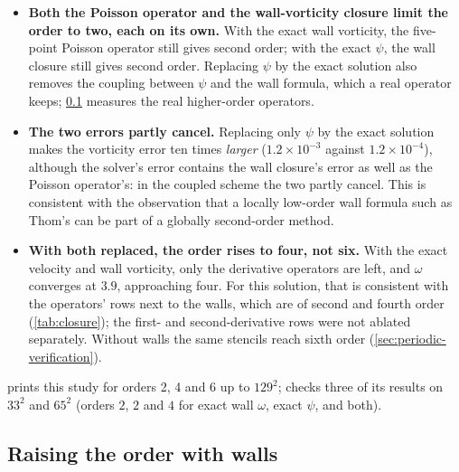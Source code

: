 \documentclass[11pt,a4paper]{article}
\newcommand{\code}[1]{\texttt{\detokenize{#1}}}
\begin{document}
\begin{itemize}[leftmargin=2em]
  \item \textbf{Both the Poisson operator and the wall-vorticity closure limit the order to two, each on its own.}  With the exact wall vorticity, the five-point Poisson operator still gives second order; with the exact $\psi$, the wall closure still gives second order.  Replacing $\psi$ by the exact solution also removes the coupling between $\psi$ and the wall formula, which a real operator keeps; \cref{sec:wall-order} measures the real higher-order operators.
  \item \textbf{The two errors partly cancel.}  Replacing only $\psi$ by the exact solution makes the vorticity error ten times \emph{larger} ($1.2\times10^{-3}$ against $1.2\times10^{-4}$), although the solver's error contains the wall closure's error as well as the Poisson operator's: in the coupled scheme the two partly cancel.  This is consistent with the observation that a locally low-order wall formula such as Thom's can be part of a globally second-order method.
  \item \textbf{With both replaced, the order rises to four, not six.}  With the exact velocity and wall vorticity, only the derivative operators are left, and $\omega$ converges at $3.9$, approaching four.  For this solution, that is consistent with the operators' rows next to the walls, which are of second and fourth order (\cref{tab:closure}); the first- and second-derivative rows were not ablated separately.  Without walls the same stencils reach sixth order (\cref{sec:periodic-verification}).
\end{itemize}
\code{make ablation} prints this study for orders 2, 4 and 6 up to $129^2$; \code{make test} checks three of its results on $33^2$ and $65^2$ (orders $2$, $2$ and $4$ for exact wall $\omega$, exact $\psi$, and both).

\subsection{Raising the order with walls}
\label{sec:wall-order}
\end{document}
